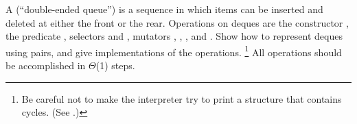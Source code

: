 \begin{exercise}
	\label{Exercise 3.23}
		A  (“double-ended queue”) is a sequence in which items can be inserted and deleted at either the front or the rear.
		Operations on deques are the constructor , the predicate , selectors  and , mutators , , , and .
		Show how to represent deques using pairs, and give implementations of the operations.%
	\footnote{
		Be careful not to make the interpreter try to print a structure that contains cycles.
		(See .)
	}
	All operations should be accomplished in \( Θ \)(1) steps.
\end{exercise}
